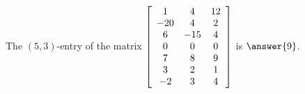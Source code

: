 \documentclass{ximera}
\author{Zack Reed}
\begin{document}
  
\begin{exercise}
  The $(5,3)$-entry of the matrix $\startmat{ccc}
    1 & 4 & 12 \\
    -20 & 4 & 2 \\
    6 & -15 & 4 \\
    0 & 0 & 0 \\
    7 & 8 & 9 \\
    3 & 2 & 1 \\
    -2 & 3 & 4 \\
  \stopmat$ is $\answer{9}$.
  
\end{exercise}
\end{document}
